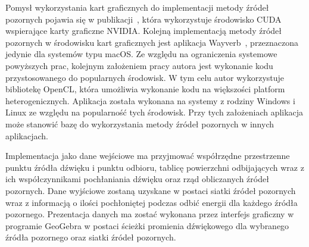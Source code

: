 Pomysł  wykorzystania kart graficznych do implementacji metody źródeł pozornych pojawia się w publikacji~\cite{b9}, która wykorzystuje środowisko CUDA wspierające karty graficzne NVIDIA. Kolejną implementacją metody źródeł pozornych w środowisku kart graficznych jest aplikacja Wayverb~\cite{b10}, przeznaczona jedynie dla systemów typu macOS. Ze względu na ograniczenia systemowe powyższych prac, kolejnym założeniem pracy autora jest wykonanie kodu przystosowanego do popularnych środowisk. W tym celu autor wykorzystuje bibliotekę OpenCL, która umożliwia wykonanie kodu na większości platform heterogenicznych. Aplikacja została wykonana na systemy z rodziny Windows i Linux ze względu na popularność tych środowisk. Przy tych założeniach aplikacja może stanowić bazę do wykorzystania metody źródeł pozornych w innych aplikacjach.

Implementacja jako dane wejściowe ma przyjmować współrzędne przestrzenne punktu źródła dźwięku i punktu odbioru, tablicę powierzchni odbijających wraz z ich współczynnikami pochłaniania dźwięku oraz rząd obliczanych źródeł pozornych. Dane wyjściowe zostaną uzyskane w postaci siatki źródeł pozornych wraz z informacją o ilości pochłoniętej podczas odbić energii dla każdego źródła pozornego. Prezentacja danych ma zostać wykonana przez interfejs graficzny w programie GeoGebra w postaci ścieżki promienia dźwiękowego dla wybranego źródła pozornego oraz siatki źródeł pozornych.
















